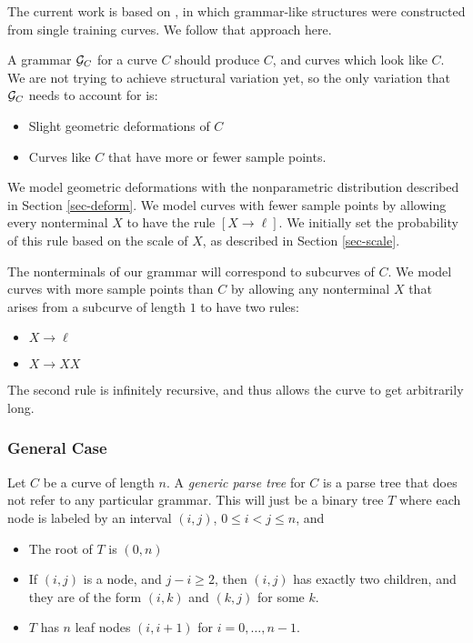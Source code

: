 \documentclass{article}
\newcommand\note[1]{}
\begin{document}
The current work is based on \cite{hcm}, in which grammar-like
structures were constructed from single training curves. We follow
that approach here.

A grammar ${\mathcal G}_C$ for a curve $C$ should produce $C$, and curves
which look like $C$. We are not trying to achieve structural variation
yet, so the only variation that ${\mathcal G}_C$ needs to account for is:
\begin{itemize}
\item Slight geometric deformations of $C$
\item Curves like $C$ that have more or fewer sample points.
\end{itemize}
We model geometric deformations with the nonparametric distribution
described in Section \ref{sec-deform}. We model curves with fewer sample
points by allowing every nonterminal $X$ to have the rule $[X\to
\ell]$. We initially set the probability of this rule based on the
scale of $X$, as described in Section \ref{sec-scale}.

The nonterminals of our grammar will correspond to subcurves of $C$.
We model curves with more sample points than $C$ by allowing any
nonterminal $X$ that arises from a subcurve of length $1$ to have two
rules:
\begin{itemize}
\item $X\to \ell$
\item $X\to XX$
\end{itemize}
The second rule is infinitely recursive, and thus allows the curve to
get arbitrarily long.
  \note{Our current thinking is to have the
  probability of $X\to XX$ be chosen in the same scale-dependent way
  as the probability of $X\to YZ$. But this might be problematic.}

\subsubsection{General Case}

Let $C$ be a curve of length $n$. A \emph{generic parse tree} for $C$
is a parse tree that does not refer to any particular grammar. This
will just be a binary tree $T$ where each node is labeled by an
interval $(i,j)$, $0\le i < j \le n$, and
\begin{itemize}
\item The root of $T$ is $(0,n)$
\item If $(i,j)$ is a node, and $j-i \ge 2$, then $(i,j)$ has exactly
  two children, and they are of the form $(i,k)$ and $(k,j)$ for some
  $k$.
\item $T$ has $n$ leaf nodes $(i,i+1)$ for $i=0,\dots,n-1$.
\end{itemize}
\end{document}
